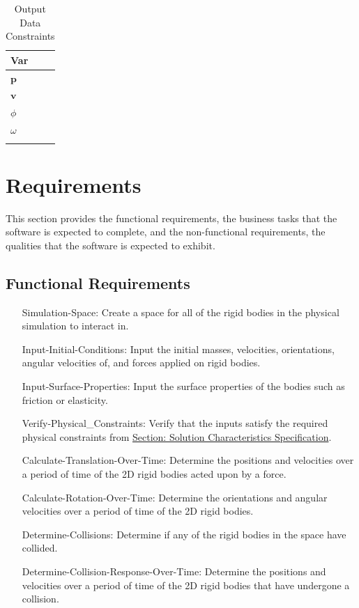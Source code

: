 \documentclass[12pt]{article}
\begin{document}
\begin{longtable}{l}
\toprule
Var
\\
\midrule
\endhead
$\mathbf{p}$
\\
$\mathbf{v}$
\\
$ϕ$
\\
$ω$
\\
\bottomrule
\caption{Output Data Constraints}
\label{Table:OutDataConstraints}
\end{longtable}
\section{Requirements}
\label{Sec:Requirements}
This section provides the functional requirements, the business tasks that the software is expected to complete, and the non-functional requirements, the qualities that the software is expected to exhibit.
\subsection{Functional Requirements}
\label{Sec:FRs}
\begin{itemize}
\item[Simulation-Space:\phantomsection\label{reqSS}]Create a space for all of the rigid bodies in the physical simulation to interact in.
\item[Input-Initial-Conditions:\phantomsection\label{reqIIC}]Input the initial masses, velocities, orientations, angular velocities of, and forces applied on rigid bodies.
\item[Input-Surface-Properties:\phantomsection\label{reqISP}]Input the surface properties of the bodies such as friction or elasticity.
\item[Verify-Physical\_Constraints:\phantomsection\label{reqVPC}]Verify that the inputs satisfy the required physical constraints from \hyperref[Sec:SolCharSpec]{Section: Solution Characteristics Specification}.
\item[Calculate-Translation-Over-Time:\phantomsection\label{reqCTOT}]Determine the positions and velocities over a period of time of the 2D rigid bodies acted upon by a force.
\item[Calculate-Rotation-Over-Time:\phantomsection\label{reqCROT}]Determine the orientations and angular velocities over a period of time of the 2D rigid bodies.
\item[Determine-Collisions:\phantomsection\label{reqDC}]Determine if any of the rigid bodies in the space have collided.
\item[Determine-Collision-Response-Over-Time:\phantomsection\label{reqDCROT}]Determine the positions and velocities over a period of time of the 2D rigid bodies that have undergone a collision.
\end{itemize}
\end{document}
